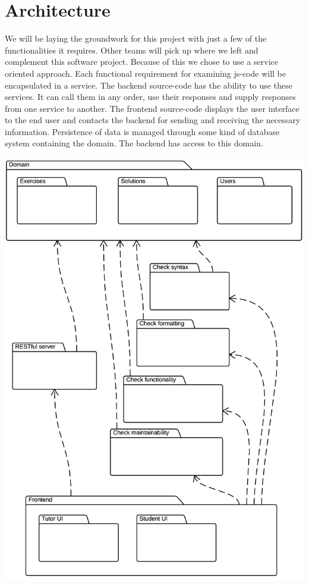 %

\section{Architecture}
We will be laying the groundwork for this project
with just a few of the functionalities it requires.
Other teams will pick up where we left and complement this software project.
Because of this we chose to use a service oriented approach.
Each functional requirement for examining \gls{js-code}
will be encapsulated in a service.
The backend \gls{source-code} has the ability to use these services.
It can call them in any order, use their responses
and supply responses from one service to another.
The frontend \gls{source-code} displays the user interface to the end user
and contacts the backend for sending and receiving the necessary information.
Persistence of data is managed through some kind of database system
containing the domain.
The backend has access to this domain.

\includegraphics[scale=0.75] {diagrams-images/architecture}

